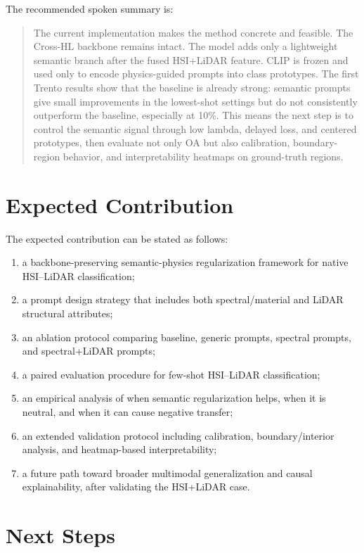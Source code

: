 \documentclass[10pt,journal,compsoc]{IEEEtran}
\begin{document}
The recommended spoken summary is:

\begin{quote}
The current implementation makes the method concrete and feasible. The Cross-HL backbone remains intact. The model adds only a lightweight semantic branch after the fused HSI+LiDAR feature. CLIP is frozen and used only to encode physics-guided prompts into class prototypes. The first Trento results show that the baseline is already strong: semantic prompts give small improvements in the lowest-shot settings but do not consistently outperform the baseline, especially at 10\%. This means the next step is to control the semantic signal through low lambda, delayed loss, and centered prototypes, then evaluate not only OA but also calibration, boundary-region behavior, and interpretability heatmaps on ground-truth regions.
\end{quote}

\section{Expected Contribution}

The expected contribution can be stated as follows:

\begin{enumerate}
    \item a backbone-preserving semantic-physics regularization framework for native HSI--LiDAR classification;
    \item a prompt design strategy that includes both spectral/material and LiDAR structural attributes;
    \item an ablation protocol comparing baseline, generic prompts, spectral prompts, and spectral+LiDAR prompts;
    \item a paired evaluation procedure for few-shot HSI--LiDAR classification;
    \item an empirical analysis of when semantic regularization helps, when it is neutral, and when it can cause negative transfer;
    \item an extended validation protocol including calibration, boundary/interior analysis, and heatmap-based interpretability;
    \item a future path toward broader multimodal generalization and causal explainability, after validating the HSI+LiDAR case.
\end{enumerate}

\section{Next Steps}
\end{document}
